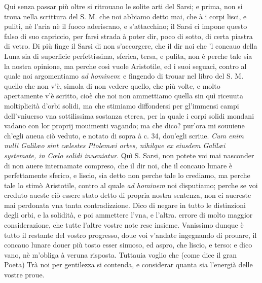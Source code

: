\documentclass[11pt,twoside,openany]{book}
\begin{document}
Qui senza passar più oltre si ritrouano le solite arti del Sarsi; e prima, non si troua nella scrittura del S. M. che noi abbiamo detto mai, che à i corpi lisci, e puliti, nè l'aria nè il fuoco aderiscano, e s'attacchino; il Sarsi ci impone questo falso di suo capriccio, per farsi strada à poter dir, poco di sotto, di certa piastra di vetro. Di più finge il Sarsi di non s'accorgere, che il dir noi che 'l concauo della Luna sia di superficie perfettissima, sferica, tersa, e pulita, non è perche tale sia la nostra opinione, ma perche così vuole Aristotile, ed i suoi seguaci, contro al quale noi argomentiamo \textit{ad }\textit{hominem}: e fingendo di trouar nel libro del S. M. quello che non v'è, simola di non vedere quello, che più volte, e molto apertamente v'è scritto, cioè che noi non ammettiamo quella sin quì riceuuta moltiplicità d'orbi solidi, ma che stimiamo diffondersi per gl'immensi campi dell'vniuerso vna sottilissima sostanza eterea, per la quale i corpi solidi mondani vadano con lor proprij mouimenti vagando; ma che dico? pur'ora mi souuiene ch'egli aueua ciò veduto, e notato di sopra à c. 34, dou'egli scriue. \textit{Cum enim nulli Galilæo sint cælestes Ptolemæi orbes, nihilque ex eiusdem Galilæi systemate, in Cœlo solidi inueniatur}. Quì S. Sarsi, non potete voi mai nasconder di non auere internamate compreso, che il dir noi, che il concauo lunare è perfettamente sferico, e liscio, sia detto non perche tale lo crediamo, ma perche tale lo stimò Aristotile, contro al quale \textit{ad hominem} noi disputiamo; perche se voi creduto aueste ciò essere stato detto di propria nostra sentenza, non ci auereste mai perdonata vna tanta contradizzione. Dico di negare in tutto le distinzioni degli orbi, e la solidità, e poi ammettere l'vna, e l'altra. errore di molto maggior considerazione, che tutte l'altre vostre note rese insieme. Vanissimo dunque è tutto il restante del vostro progresso, doue voi v'andate ingegnando di prouare, il concauo lunare douer più tosto esser sinuoso, ed aspro, che liscio, e terso: e dico vano, nè m'obliga à veruna risposta. Tuttauia voglio che (come dice il gran Poeta) Trà noi per gentilezza si contenda, e considerar quanta sia l'energià delle vostre proue.
\end{document}
